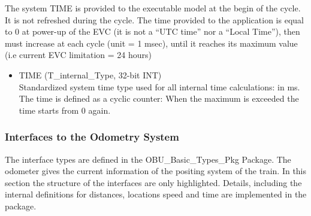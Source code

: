 \documentclass{template/openetcs_report}
\begin{document}
The system TIME is provided to the executable model at the begin of the cycle. It is not refreshed during the cycle. The time provided to the application is equal to 0 at power-up of the EVC (it is not a “UTC time” nor a “Local
Time”), then must increase at each cycle (unit = 1 msec), until it reaches its maximum value (i.e current EVC
limitation = 24 hours)

\begin{itemize}
\item TIME (T\_internal\_Type, 32-bit INT)\\
Standardized system time type used for all internal time calculations: in ms. The time is defined as a cyclic counter: When the maximum is exceeded the time starts from 0 again. 
\end{itemize}

\subsubsection{Interfaces to the Odometry System}
The interface types are defined in the OBU\_Basic\_Types\_Pkg Package. 
The odometer gives the current information of the positing system of the train. In this section the structure of the interfaces are only highlighted. Details, including the internal definitions for distances, locations speed and time are implemented in the package. 
\end{document}
